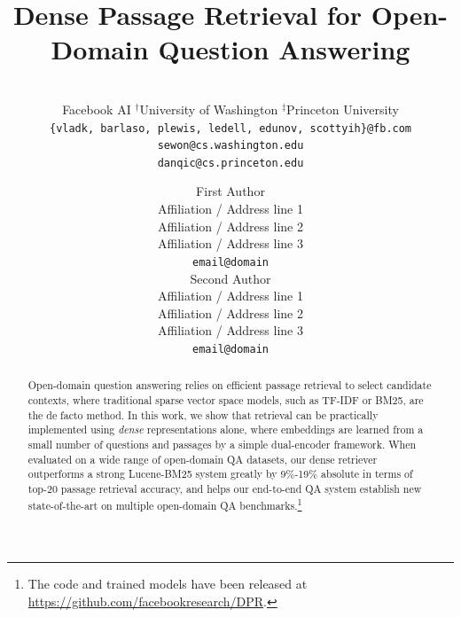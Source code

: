 \documentclass[11pt,a4paper]{article}
\title{Dense Passage Retrieval for Open-Domain Question Answering}
\author{\makecell{Vladimir Karpukhin\thanks{\hspace{.06in}Equal contribution}, Barlas O\u{g}uz\samethanks, Sewon Min$^\dagger$, Patrick Lewis, \\ Ledell Wu, Sergey Edunov, Danqi Chen$^\ddagger$, Wen-tau Yih} \\
Facebook AI \quad\quad  $^\dagger$University of Washington \quad\quad  $^\ddagger$Princeton University \\
\texttt{\{vladk, barlaso, plewis, ledell, edunov, scottyih\}@fb.com} \\
\texttt{sewon@cs.washington.edu} \\
\texttt{danqic@cs.princeton.edu} \\
}
\author{First Author \\
  Affiliation / Address line 1 \\
  Affiliation / Address line 2 \\
  Affiliation / Address line 3 \\
  \texttt{email@domain} \\\And
  Second Author \\
  Affiliation / Address line 1 \\
  Affiliation / Address line 2 \\
  Affiliation / Address line 3 \\
  \texttt{email@domain} \\}
\date{}
\begin{document}
\maketitle

\begin{abstract}
Open-domain question answering relies on efficient passage retrieval to select candidate contexts, where traditional sparse vector space models, such as TF-IDF or BM25, are the de facto method.
In this work, we show that retrieval can be practically implemented using \emph{dense} representations alone, where embeddings are learned from a small number of questions and passages by a simple dual-encoder framework.
When evaluated on a wide range of open-domain QA datasets, our dense retriever outperforms a strong Lucene-BM25 system greatly by 9\%-19\% absolute in terms of top-20 passage retrieval accuracy,
and helps our end-to-end QA system establish new state-of-the-art on multiple open-domain QA benchmarks.\footnote{The code and trained models have been released at \href{https://github.com/facebookresearch/DPR}{https://github.com/facebookresearch/DPR}.}


\end{abstract}














\clearpage %
\appendix

\end{document}
